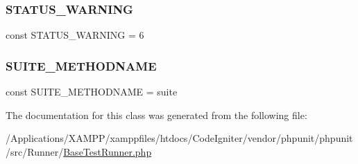 \subsubsection{\texorpdfstring{S\+T\+A\+T\+U\+S\+\_\+\+W\+A\+R\+N\+I\+NG}{STATUS\_WARNING}}
{\footnotesize\ttfamily const S\+T\+A\+T\+U\+S\+\_\+\+W\+A\+R\+N\+I\+NG = 6}

\mbox{\label{class_p_h_p_unit___runner___base_test_runner_ac14c4ab6649e297d40a71879c09ba32e}} 
\subsubsection{\texorpdfstring{S\+U\+I\+T\+E\+\_\+\+M\+E\+T\+H\+O\+D\+N\+A\+ME}{SUITE\_METHODNAME}}
{\footnotesize\ttfamily const S\+U\+I\+T\+E\+\_\+\+M\+E\+T\+H\+O\+D\+N\+A\+ME = \textquotesingle{}suite\textquotesingle{}}



The documentation for this class was generated from the following file\+:\begin{DoxyCompactItemize}
\item 
/\+Applications/\+X\+A\+M\+P\+P/xamppfiles/htdocs/\+Code\+Igniter/vendor/phpunit/phpunit/src/\+Runner/\mbox{\hyperlink{_base_test_runner_8php}{Base\+Test\+Runner.\+php}}\end{DoxyCompactItemize}
